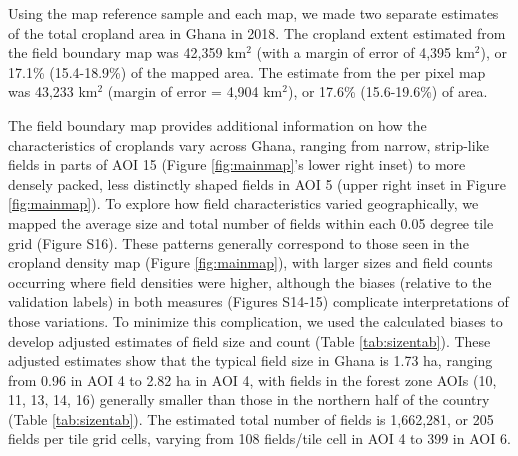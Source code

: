 \documentclass[11pt,a4paper]{article}
\begin{document}
Using the map reference sample and each map, we made two separate
estimates of the total cropland area in Ghana in 2018. The cropland
extent estimated from the field boundary map was 42,359 km\(^2\) (with a
margin of error of 4,395 km\(^2\)), or 17.1\% (15.4-18.9\%) of the
mapped area. The estimate from the per pixel map was 43,233 km\(^2\)
(margin of error = 4,904 km\(^2\)), or 17.6\% (15.6-19.6\%) of area.

The field boundary map provides additional information on how the
characteristics of croplands vary across Ghana, ranging from narrow,
strip-like fields in parts of AOI 15 (Figure \ref{fig:mainmap}'s lower
right inset) to more densely packed, less distinctly shaped fields in
AOI 5 (upper right inset in Figure \ref{fig:mainmap}). To explore how
field characteristics varied geographically, we mapped the average size
and total number of fields within each 0.05 degree tile grid (Figure
S16). These patterns generally correspond to those seen in the cropland
density map (Figure \ref{fig:mainmap}), with larger sizes and field
counts occurring where field densities were higher, although the biases
(relative to the validation labels) in both measures (Figures S14-15)
complicate interpretations of those variations. To minimize this
complication, we used the calculated biases to develop adjusted
estimates of field size and count (Table \ref{tab:sizentab}). These
adjusted estimates show that the typical field size in Ghana is 1.73 ha,
ranging from 0.96 in AOI 4 to 2.82 ha in AOI 4, with fields in the
forest zone AOIs (10, 11, 13, 14, 16) generally smaller than those in
the northern half of the country (Table \ref{tab:sizentab}). The
estimated total number of fields is 1,662,281, or 205 fields per tile
grid cells, varying from 108 fields/tile cell in AOI 4 to 399 in AOI 6.
\end{document}

